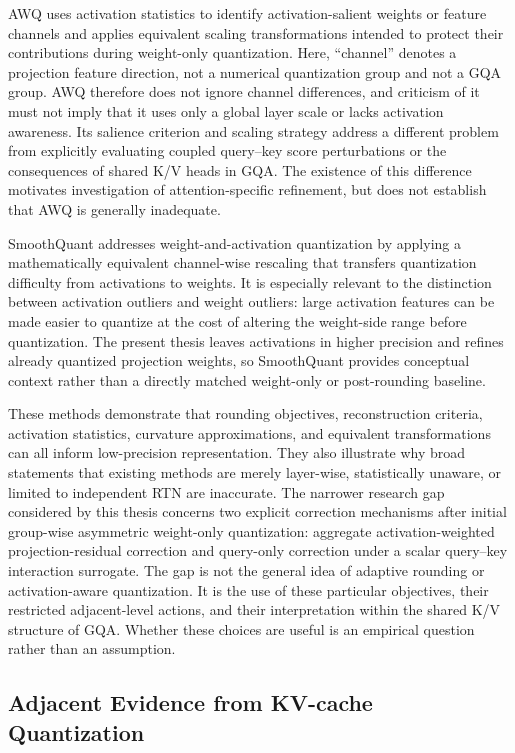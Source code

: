 AWQ \cite{lin2023awq} uses activation statistics to identify activation-salient weights or feature channels and applies equivalent scaling transformations intended to protect their contributions during weight-only quantization. Here, ``channel'' denotes a projection feature direction, not a numerical quantization group and not a GQA group. AWQ therefore does not ignore channel differences, and criticism of it must not imply that it uses only a global layer scale or lacks activation awareness. Its salience criterion and scaling strategy address a different problem from explicitly evaluating coupled query--key score perturbations or the consequences of shared K/V heads in GQA. The existence of this difference motivates investigation of attention-specific refinement, but does not establish that AWQ is generally inadequate.

SmoothQuant \cite{xiao2023smoothquant} addresses weight-and-activation quantization by applying a mathematically equivalent channel-wise rescaling that transfers quantization difficulty from activations to weights. It is especially relevant to the distinction between activation outliers and weight outliers: large activation features can be made easier to quantize at the cost of altering the weight-side range before quantization. The present thesis leaves activations in higher precision and refines already quantized projection weights, so SmoothQuant provides conceptual context rather than a directly matched weight-only or post-rounding baseline.

These methods demonstrate that rounding objectives, reconstruction criteria, activation statistics, curvature approximations, and equivalent transformations can all inform low-precision representation. They also illustrate why broad statements that existing methods are merely layer-wise, statistically unaware, or limited to independent RTN are inaccurate. The narrower research gap considered by this thesis concerns two explicit correction mechanisms after initial group-wise asymmetric weight-only quantization: aggregate activation-weighted projection-residual correction and query-only correction under a scalar query--key interaction surrogate. The gap is not the general idea of adaptive rounding or activation-aware quantization. It is the use of these particular objectives, their restricted adjacent-level actions, and their interpretation within the shared K/V structure of GQA. Whether these choices are useful is an empirical question rather than an assumption.

\subsection{Adjacent Evidence from KV-cache Quantization}


